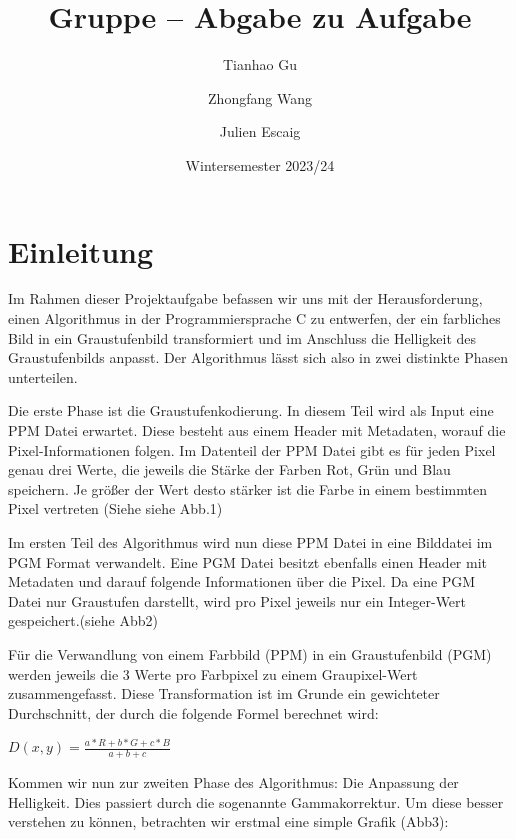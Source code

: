 \documentclass[course=erap]{aspdoc}
\author{Tianhao Gu \and Zhongfang Wang \and Julien Escaig}
\date{Wintersemester 2023/24} %
\title{Gruppe \theGroup{} -- Abgabe zu Aufgabe \theNumber}
\begin{document}
\maketitle

\section{Einleitung}
\par
Im Rahmen dieser Projektaufgabe befassen wir uns mit der Herausforderung, einen Algorithmus in der Programmiersprache C zu entwerfen, der ein farbliches Bild in ein Graustufenbild transformiert und im Anschluss die Helligkeit des Graustufenbilds anpasst. Der Algorithmus lässt sich also in zwei distinkte Phasen unterteilen.

\par
Die erste Phase ist die Graustufenkodierung. In diesem Teil wird als Input eine PPM Datei erwartet. Diese besteht aus einem Header mit Metadaten, worauf die Pixel-Informationen folgen. Im Datenteil der PPM Datei gibt es für jeden Pixel genau drei Werte, die jeweils die Stärke der Farben Rot, Grün und Blau speichern. Je größer der Wert desto stärker ist die Farbe in einem bestimmten Pixel vertreten (Siehe siehe Abb.1)


\par
Im ersten Teil des Algorithmus wird nun diese PPM Datei in eine Bilddatei im PGM Format verwandelt. Eine PGM Datei besitzt ebenfalls einen Header mit Metadaten und darauf folgende Informationen über die Pixel. Da eine PGM Datei nur Graustufen darstellt, wird pro Pixel jeweils nur ein Integer-Wert gespeichert.(siehe Abb2)


\par
Für die Verwandlung von einem Farbbild (PPM) in ein Graustufenbild (PGM) werden jeweils die 3 Werte pro Farbpixel zu einem Graupixel-Wert zusammengefasst. Diese Transformation ist im Grunde ein gewichteter Durchschnitt, der durch die folgende Formel berechnet wird:

\begin{center}
${D(x,y)=\frac{a*R+b*G+c*B}{a+b+c}}$
\end{center}

\par
Kommen wir nun zur zweiten Phase des Algorithmus: Die Anpassung der Helligkeit. Dies passiert durch die sogenannte Gammakorrektur. Um diese besser verstehen zu können, betrachten wir erstmal eine simple Grafik (Abb3):
\end{document}

